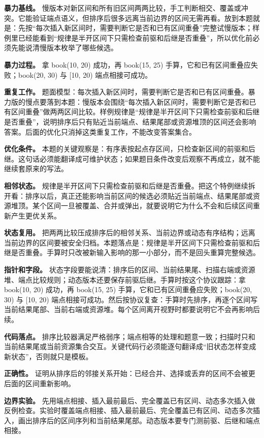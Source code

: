 \textbf{暴力基线。} 慢版本对新区间和所有旧区间两两比较，手工判断相交、覆盖或冲突。它能验证端点语义，但排序后很多远离当前边界的区间无需再看。放到本题就是：先按“每次插入新区间时，需要判断它是否和已有区间重叠”完整试慢版本；样例里已经能看到“规律是半开区间下只需检查前驱和后继是否重叠”，所以优化前必须先能说清慢版本枚举了哪些候选。

\textbf{暴力过程。} 拿 book(10, 20) 成功，再 book(15, 25) 手算，它和已有区间重叠应失败；book(20, 30) 与 [10, 20) 端点相接可成功。

\textbf{重复工作。} 题面模型：每次插入新区间时，需要判断它是否和已有区间重叠。暴力版的慢点要落到本题：慢版本会围绕“每次插入新区间时，需要判断它是否和已有区间重叠”做两两区间比较。样例规律是“规律是半开区间下只需检查前驱和后继是否重叠”，说明排序后只有贴近当前端点、结果尾部或资源堆顶的区间还会影响答案。后面的优化只消掉这类重复工作，不能改变答案集合。

\textbf{优化条件。} 本题的关键观察是：有序表按起点存区间，只检查新区间的前驱和后继。这句话必须能翻译成可维护状态；如果题目条件改变后观察不再成立，就不能继续套原来的写法。

\textbf{相邻状态。} 规律是半开区间下只需检查前驱和后继是否重叠。把这个特例继续拆开看：排序以后，真正还能影响当前区间的候选必须贴近当前端点、结果尾部或资源堆顶。某个区间一旦被覆盖、合并或弹出，就要说明它为什么不会和后续区间重新产生更优关系。

\textbf{状态复用。} 把两两比较压成排序后的相邻关系、当前边界或动态有序结构；远离当前边界的区间要被安全归档。本题落点是：规律是半开区间下只需检查前驱和后继是否重叠。手算时只改被新输入影响的那一小部分，而不是回头重算完整候选。

\textbf{指针和字段。} 状态字段要能说清：排序后的区间、当前结果尾、扫描右端或资源堆、端点比较规则；动态版本还要保存前驱后继。手算时按这个协议跟踪：拿 book(10, 20) 成功，再 book(15, 25) 手算，它和已有区间重叠应失败；book(20, 30) 与 [10, 20) 端点相接可成功。然后按协议复查：手算时先排序，再逐个区间写当前结果尾部、当前右端或资源堆。每个区间离开视野时都要说明它不会再影响后续。

\textbf{代码落点。} 排序比较器满足严格弱序；端点相等的处理和题意一致；扫描时只和当前结果尾或当前资源集合交互。关键代码行必须能逐句翻译成“旧状态怎样变成新状态”，否则就只是模板。

\textbf{正确性。} 证明从排序后的邻接关系开始：已经合并、选择或丢弃的区间不会被更后面的区间重新影响。

\textbf{边界实验。} 先用端点相接、插入最前最后、完全覆盖已有区间、动态多次插入做反例检查。实验时覆盖端点相接、插入最前最后、完全覆盖已有区间、动态多次插入，画出排序后的区间序列和当前结果尾部。动态版本要专门测前驱、后继和端点相接。

